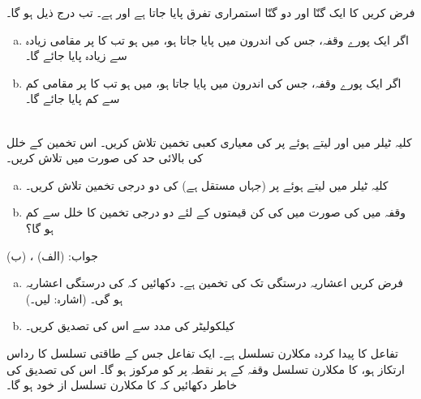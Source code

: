 فرض کریں  کا  ایک گنّا اور دو گنّا استمراری تفرق پایا جاتا ہے اور  ہے۔ تب درج ذیل ہو گا۔
\begin{enumerate}[a.]
\item
اگر ایک پورے  وقفہ، جس کی اندرون میں  پایا جاتا ہو، میں  ہو تب  کا  پر مقامی زیادہ سے زیادہ پایا جائے گا۔
\item
اگر ایک  پورے وقفہ، جس کی اندرون میں  پایا جاتا ہو، میں  ہو تب  کا  پر مقامی کم سے کم پایا جائے گا۔
\end{enumerate}
\\
کلیہ ٹیلر میں  اور  لیتے ہوئے  پر  کی معیاری کعبی تخمین تلاش کریں۔ اس تخمین کے خلل کی بالائی حد  کی صورت میں تلاش کریں۔
\begin{enumerate}[a.]
\item
کلیہ ٹیلر میں  لیتے ہوئے  پر   (جہاں  مستقل ہے) کی دو درجی تخمین تلاش کریں۔
\item
وقفہ  میں  کی صورت میں  کی کن قیمتوں کے لئے دو درجی تخمین کا خلل  سے کم ہو گا؟ 
\end{enumerate}
جواب:\quad
(الف) ، (ب) 
\\
\begin{enumerate}[a.]
\item
فرض کریں  اعشاریہ درستگی تک  کی تخمین  ہے۔ دکھائیں کہ  کی درستگی  اعشاریہ ہو گی۔ (اشارہ:  لیں۔)
\item
کیلکولیٹر کی مدد سے اس کی تصدیق کریں۔
\end{enumerate}
تفاعل  کا پیدا کردہ مکلارن تسلسل  ہے۔ ایک تفاعل جس کے طاقتی تسلسل  کا رداس ارتکاز  ہو، کا مکلارن تسلسل وقفہ  کے ہر نقطہ پر  کو مرکوز ہو گا۔ اس کی تصدیق کی خاطر دکھائیں کہ  کا مکلارن تسلسل از خود  ہو گا۔ 

